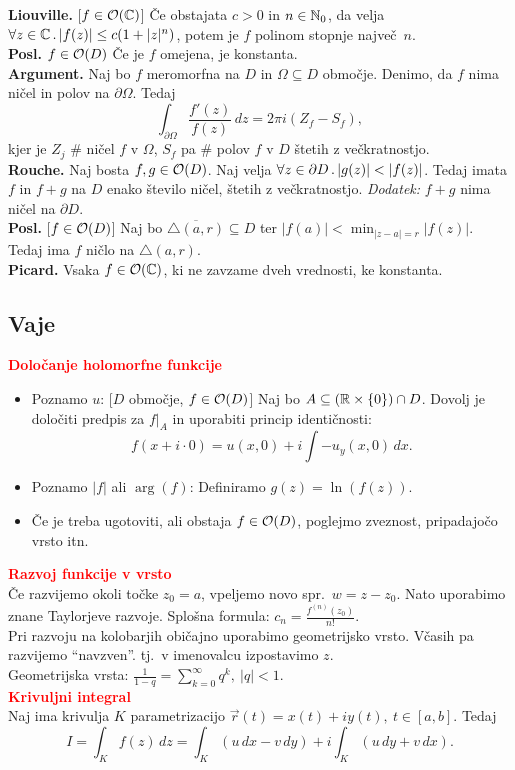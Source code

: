 \documentclass[a4paper,oneside,8pt,landscape]{extarticle}
\begin{document}
\begin{multicols*}{3}
%
\textbf{Liouville.} [\(f \in \mathcal{O}(\mathbb{C})\)] Če obstajata \(c > 0\) in \(n \in \mathbb{N}_0\), da velja \(\forall z \in \mathbb{C} \,.\, |f(z)| \leq c (1 + |z|^n)\), potem je \(f\) polinom stopnje največ~\(n\).\\
%
\textbf{Posl.} \(f \in \mathcal{O}(D)\) Če je \(f\) omejena, je konstanta.\\
%
\textbf{Argument.} Naj bo \(f\) meromorfna na \(D\) in \(\Omega \subseteq D\) območje. Denimo, da \(f\) nima ničel in polov na \(\partial \Omega\). Tedaj
\[
    \int_{\partial \Omega} \frac{f'(z)}{f(z)} \, dz = 2 \pi i(Z_f - S_f),
\]
kjer je \(Z_j\) \# ničel \(f\) v \(\Omega\), \(S_f\) pa \# polov \(f\) v \(D\) štetih z večkratnostjo.\\
%
\textbf{Rouche.} Naj bosta \(f, g \in \mathcal{O}(D)\). Naj velja \(\forall z \in \partial D \,.\, |g(z)| < |f(z)|\). Tedaj imata \(f\) in \(f+ g\) na \(D\) enako število ničel, štetih z večkratnostjo. \emph{Dodatek:} \(f + g\) nima ničel na \(\partial D\).\\
\textbf{Posl.} [\(f \in \mathcal{O}(D)\)] Naj bo \(\overline{\triangle(a, r)} \subseteq D\) ter \(|f(a)| < \min_{|z-a|=r}|f(z)|\). Tedaj ima \(f\) ničlo na \(\triangle(a, r)\).\\
\textbf{Picard.} Vsaka \(f \in \mathcal{O}(\mathbb{C})\), ki ne zavzame dveh vrednosti, ke konstanta.
\subsection*{Vaje}
%
\textbf{\textcolor{red}{Določanje holomorfne funkcije}}
\begin{itemize}
    \item Poznamo \(u\): [\(D\) območje, \(f \in \mathcal{O}(D)\)] Naj bo \(A \subseteq (\mathbb{R} \times \{0\}) \cap D\). Dovolj je določiti predpis za \(f|_{A}\) in uporabiti princip identičnosti:
    \[
        f(x + i \cdot 0) = u(x, 0) + i \int -u_y(x, 0) \, dx.
    \]
    \item Poznamo \(|f|\) ali \(\arg(f)\): Definiramo \(g(z) = \ln(f(z))\).
    \item Če je treba ugotoviti, ali obstaja \(f \in \mathcal{O}(D)\), poglejmo zveznost, pripadajočo vrsto itn.
\end{itemize}
%
\textbf{\textcolor{red}{Razvoj funkcije v vrsto}}\\
Če razvijemo okoli točke \(z_0 = a\), vpeljemo novo spr.\ \(w = z - z_0\). Nato uporabimo znane Taylorjeve razvoje. Splošna formula: \(c_n = \frac{f^{(n)}(z_0)}{n!}\).\\
%
Pri razvoju na kolobarjih običajno uporabimo geometrijsko vrsto. Včasih pa razvijemo "`navzven"'. tj.\ v imenovalcu izpostavimo \(z\).\\
Geometrijska vrsta: \(\frac{1}{1-q} = \sum_{k=0}^{\infty}q^k, \ |q| < 1\).\\
%
\textbf{\textcolor{red}{Krivuljni integral}}\\
Naj ima krivulja \(K\) parametrizacijo \(\vec{r}(t) =  x(t) + iy(t), \ t \in [a,b]\). Tedaj 
\[
    I = \int_{K} f(z) \, dz = \int_{K} (u\, dx - v\, dy) + i \int_{K} (u\, dy + v\, dx).
\]
\ 


\end{multicols*}
\end{document}
